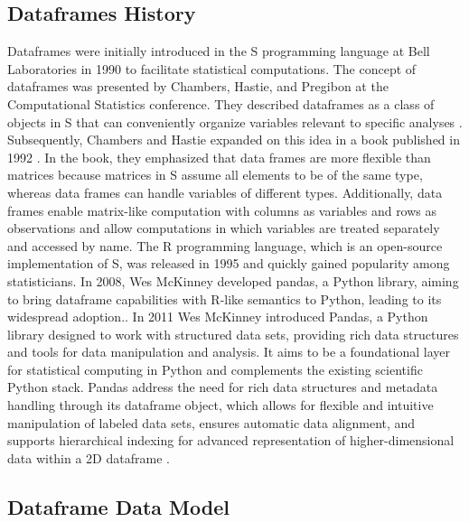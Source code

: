 \subsection{Dataframes History}

Dataframes were initially introduced in the S programming language at Bell Laboratories in 1990 to facilitate statistical computations. The concept of dataframes was presented by Chambers, Hastie, and Pregibon at the Computational Statistics conference. They described dataframes as a class of objects in S that can conveniently organize variables relevant to specific analyses \cite{chambers1990statistical}. Subsequently, Chambers and Hastie expanded on this idea in a book published in 1992 \cite{chambers1992statistical}. In the book, they emphasized that data frames are more flexible than matrices because matrices in S assume all elements to be of the same type, whereas data frames can handle variables of different types. Additionally, data frames enable matrix-like computation with columns as variables and rows as observations and allow computations in which variables are treated separately and accessed by name. The R programming language, which is an open-source implementation of S, was released in 1995 and quickly gained popularity among statisticians. In 2008, Wes McKinney developed pandas, a Python library, aiming to bring dataframe capabilities with R-like semantics to Python, leading to its widespread adoption.\cite{chambers1992statistical}. In 2011 Wes McKinney introduced Pandas, a Python library designed to work with structured data sets, providing rich data structures and tools for data manipulation and analysis. It aims to be a foundational layer for statistical computing in Python and complements the existing scientific Python stack. Pandas address the need for rich data structures and metadata handling through its dataframe object, which allows for flexible and intuitive manipulation of labeled data sets, ensures automatic data alignment, and supports hierarchical indexing for advanced representation of higher-dimensional data within a 2D dataframe \cite{McKinney2011}.


\subsection{Dataframe Data Model}

